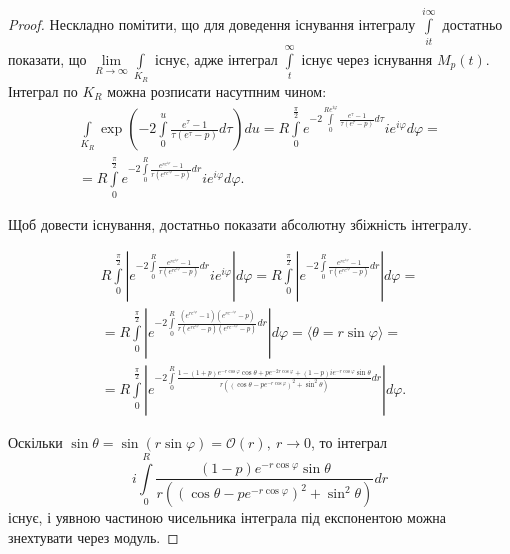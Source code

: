 \begin{lem}
\begin{proof}
Нескладно помітити, що для доведення існування інтегралу $\int\limits_{it}^{i\infty}$ достатньо показати, що $\lim\limits_{R \rightarrow \infty} \int\limits_{K_{R}}$ існує, адже інтеграл $\int\limits_{t}^{\infty}$ існує через існування $M_{p}(t)$. Інтеграл по $K_{R}$ можна розписати насутпним чином:
\begin{gather*}
\int\limits_{K_{R}} \exp\left(-2 \int\limits_{0}^{u} \frac{e^\tau -1}{\tau(e^\tau - p)} d\tau\right) du = 
R \int\limits_{0}^{\frac{\pi}{2}} e^{-2 \int\limits_{0}^{Re^{i\varphi}} \frac{e^\tau -1}{\tau(e^\tau - p)} d\tau} i e^{i\varphi}  d\varphi =\\
= R \int\limits_{0}^{\frac{\pi}{2}} e^{-2 \int\limits_{0}^{R} \frac{e^{re^{i\varphi}} -1}{r(e^{re^{i\varphi}} - p)} dr} i e^{i\varphi}  d\varphi.
\end{gather*}

Щоб довести існування, достатньо показати абсолютну збіжність інтегралу.

\begin{equation}
\begin{gathered}
R \int\limits_{0}^{\frac{\pi}{2}} \left| e^{-2 \int\limits_{0}^{R} \frac{e^{re^{i\varphi}} -1}{r(e^{re^{i\varphi}} - p)} dr} i e^{i\varphi} \right| d\varphi = R \int\limits_{0}^{\frac{\pi}{2}} \left| e^{-2 \int\limits_{0}^{R} \frac{e^{re^{i\varphi}} -1}{r(e^{re^{i\varphi}} - p)} dr} \right| d\varphi=\\
=R \int\limits_{0}^{\frac{\pi}{2}} \left| e^{-2 \int\limits_{0}^{R} \frac{(e^{re^{i\varphi}} -1)(e^{re^{-i\varphi}} - p)}{r(e^{re^{i\varphi}} - p)(e^{re^{-i\varphi}} - p)} dr} \right| d\varphi = \langle \theta = r \sin \varphi \rangle = \\
=R \int\limits_{0}^{\frac{\pi}{2}} \left| e^{-2 \int\limits_{0}^{R} \frac{1- (1+p)e^{-r \cos \varphi} \cos \theta + p e^{-2r \cos \varphi} + (1-p)ie^{-r \cos \varphi} \sin \theta}{r((\cos \theta - pe^{-r\cos \varphi})^{2} + \sin^2 \theta)} dr} \right| d\varphi.
\end{gathered}
\end{equation}

Оскільки $\sin \theta = \sin (r \sin \varphi)= \mathcal{O}(r), ~ r \rightarrow 0$, то інтеграл
\begin{equation*}
i \int\limits_{0}^{R} \frac{(1-p)e^{-r \cos \varphi} \sin \theta}{r((\cos \theta - pe^{-r\cos \varphi})^{2} + \sin^2 \theta)} dr
\end{equation*}
існує, і уявною частиною чисельника інтеграла під експонентою можна знехтувати через модуль.


\end{proof}
\end{lem}
